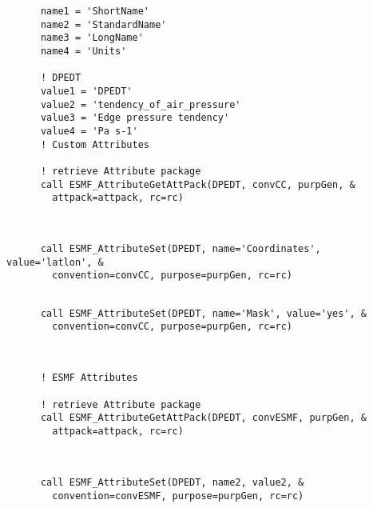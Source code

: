  \begin{verbatim}
      name1 = 'ShortName'
      name2 = 'StandardName'
      name3 = 'LongName'
      name4 = 'Units'

      ! DPEDT
      value1 = 'DPEDT'
      value2 = 'tendency_of_air_pressure'
      value3 = 'Edge pressure tendency'
      value4 = 'Pa s-1'
      ! Custom Attributes

      ! retrieve Attribute package
      call ESMF_AttributeGetAttPack(DPEDT, convCC, purpGen, &
        attpack=attpack, rc=rc)
 
\end{verbatim}
 

 \begin{verbatim}

      call ESMF_AttributeSet(DPEDT, name='Coordinates', value='latlon', &
        convention=convCC, purpose=purpGen, rc=rc)
 
\end{verbatim}
 

 \begin{verbatim}
      call ESMF_AttributeSet(DPEDT, name='Mask', value='yes', &
        convention=convCC, purpose=purpGen, rc=rc)
 
\end{verbatim}
 

 \begin{verbatim}

      ! ESMF Attributes

      ! retrieve Attribute package
      call ESMF_AttributeGetAttPack(DPEDT, convESMF, purpGen, &
        attpack=attpack, rc=rc)
 
\end{verbatim}
 

 \begin{verbatim}

      call ESMF_AttributeSet(DPEDT, name2, value2, &
        convention=convESMF, purpose=purpGen, rc=rc)
 
\end{verbatim}
 

